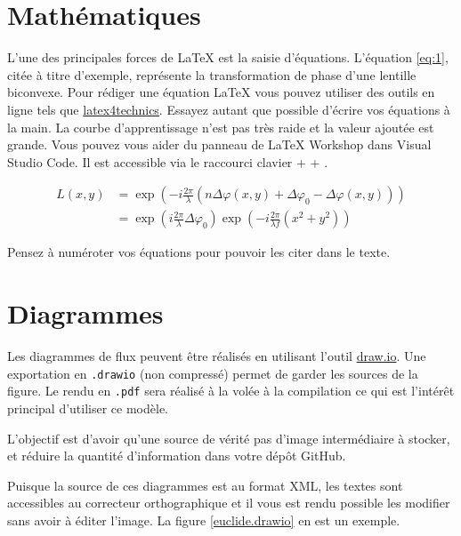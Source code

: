 \section{Mathématiques}

L'une des principales forces de \LaTeX{} est la saisie d'équations. L'équation \ref{eq:1}, citée à titre d'exemple, représente la transformation de phase d'une lentille biconvexe. Pour rédiger une équation \LaTeX{} vous pouvez utiliser des outils en ligne tels que \href{https://www.latex4technics.com/}{latex4technics}. Essayez autant que possible d'écrire vos équations à la main.
La courbe d'apprentissage n'est pas très raide et la valeur ajoutée est grande. Vous pouvez vous aider du panneau de \LaTeX{} Workshop dans Visual Studio Code. Il est accessible via le raccourci clavier  +  + .

\begin{equation} \label{eq:1}
    \begin{split}
        L(x,y) & = \exp\left( - i\frac{{2\pi }}{\lambda }\left( {n\Delta \varphi (x,y) + \Delta {\varphi _0} - \Delta \varphi (x,y)} \right)\right)     \\
               & = {\exp\left({i\frac{{2\pi }}{\lambda }\Delta {\varphi _0}}\right)}{\exp\left({ - i\frac{{2\pi }}{{\lambda f}}({x^2} + {y^2})}\right)}
    \end{split}
\end{equation}

Pensez à numéroter vos équations pour pouvoir les citer dans le texte.

\section{Diagrammes}

Les diagrammes de flux peuvent être réalisés en utilisant l'outil \href{https://app.diagrams.net/}{draw.io}. Une exportation en \texttt{.drawio} (non compressé) permet de garder les sources de la figure. Le rendu en \texttt{.pdf} sera réalisé à la volée à la compilation ce qui est l'intérêt principal d'utiliser ce modèle.

L'objectif est d'avoir qu'une source de vérité \cad pas d'image intermédiaire à stocker, et réduire la quantité d'information dans votre dépôt GitHub.

Puisque la source de ces diagrammes est au format XML, les textes sont accessibles au correcteur orthographique et il vous est rendu possible les modifier sans avoir à éditer l'image. La figure \ref{euclide.drawio} en est un exemple.

